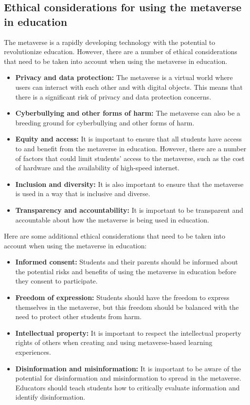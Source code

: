 \documentclass[12pt]{extarticle}
\begin{document}
\subsection*{Ethical considerations for using the metaverse in education}

The metaverse is a rapidly developing technology with the potential to revolutionize education. However, there are a number of ethical considerations that need to be taken into account when using the metaverse in education.

\begin{itemize}
    \item \textbf{Privacy and data protection:} The metaverse is a virtual world where users can interact with each other and with digital objects. This means that there is a significant risk of privacy and data protection concerns.
    \item \textbf{Cyberbullying and other forms of harm:} The metaverse can also be a breeding ground for cyberbullying and other forms of harm.
    \item \textbf{Equity and access:} It is important to ensure that all students have access to and benefit from the metaverse in education. However, there are a number of factors that could limit students' access to the metaverse, such as the cost of hardware and the availability of high-speed internet.
    \item \textbf{Inclusion and diversity:} It is also important to ensure that the metaverse is used in a way that is inclusive and diverse.
    \item \textbf{Transparency and accountability:} It is important to be transparent and accountable about how the metaverse is being used in education.
\end{itemize}

Here are some additional ethical considerations that need to be taken into account when using the metaverse in education:

\begin{itemize}
    \item \textbf{Informed consent:} Students and their parents should be informed about the potential risks and benefits of using the metaverse in education before they consent to participate.
    \item \textbf{Freedom of expression:} Students should have the freedom to express themselves in the metaverse, but this freedom should be balanced with the need to protect other students from harm.
    \item \textbf{Intellectual property:} It is important to respect the intellectual property rights of others when creating and using metaverse-based learning experiences.
    \item \textbf{Disinformation and misinformation:} It is important to be aware of the potential for disinformation and misinformation to spread in the metaverse. Educators should teach students how to critically evaluate information and identify disinformation.
\end{itemize}
\end{document}
